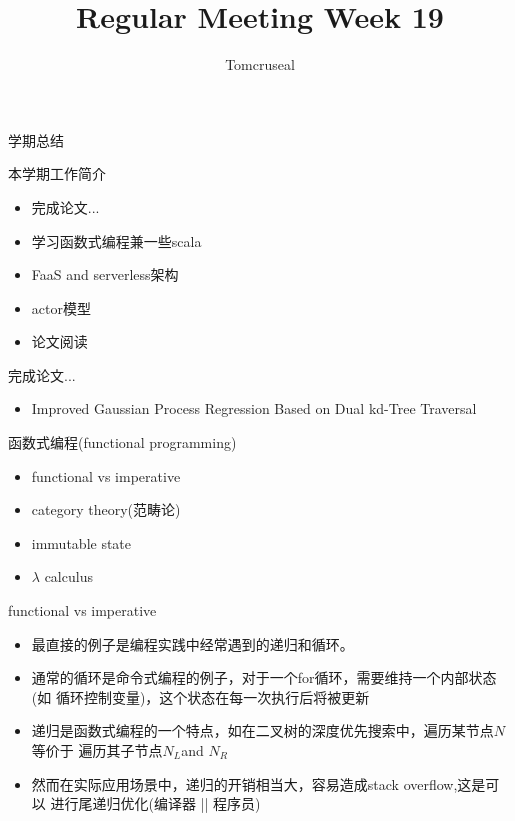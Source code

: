\documentclass{beamer}
\author{Tomcruseal}
\title{Regular Meeting Week 19}
\institute{School of Computer Science and Technology SCUT }
\begin{document}
	\frame{\titlepage} \centering 学期总结
	



   
    \begin{frame}本学期工作简介
    	\begin{itemize}
    		\item 完成论文...
    		\item 学习函数式编程兼一些scala
    		\item FaaS and serverless架构
    		\item actor模型
    		\item 论文阅读
    	\end{itemize}
    \end{frame}
    
    \begin{frame}完成论文...
    	\begin{itemize}
    		\item Improved Gaussian Process Regression Based on Dual kd-Tree Traversal
        \end{itemize}
    \end{frame}

    \begin{frame}函数式编程(functional programming)
        \begin{itemize}
        	\item functional vs imperative
        	\item category theory(范畴论) 
        	\item immutable state
        	\item $\lambda$ calculus
        \end{itemize}
    \end{frame}

    \begin{frame}functional vs imperative
    	\begin{itemize}
    	    \item 最直接的例子是编程实践中经常遇到的递归和循环。
    	    \item 通常的循环是命令式编程的例子，对于一个for循环，需要维持一个内部状态(如
    	            循环控制变量)，这个状态在每一次执行后将被更新
    	    \item 递归是函数式编程的一个特点，如在二叉树的深度优先搜索中，遍历某节点$N$等价于
    	            遍历其子节点$N_L$and $N_R$
    	    \item 然而在实际应用场景中，递归的开销相当大，容易造成stack overflow,这是可以
    	            进行尾递归优化(编译器 || 程序员)
    	\end{itemize}
    \end{frame}
\end{document}
